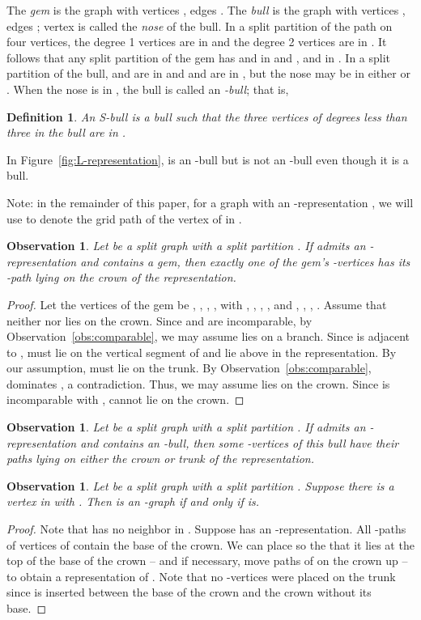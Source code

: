 \documentclass[11pt,3p,times]{elsarticle}
\newenvironment{myproof}{\begin{proof}}{\end{proof}}
\newcommand{\proofBox}{\hfill }
\newtheorem{observation}[theorem]{Observation}
\newtheorem{definition}{Definition}
\begin{document}
The {\em gem} is the graph with vertices , edges
. The {\em bull} is the graph with vertices
, edges ; vertex  is called the {\em nose}
of the bull.  In a split partition  of the path  on four
vertices, the degree 1 vertices are in  and the degree 2 vertices
are in . It follows that any split partition of the gem has  and 
in  and ,  and  in .  In a split partition of the bull,
 and  are in  and  and  are in , but the
nose  may be in either  or . When the nose is in , the
bull is called an {\em -bull}; that is,

\begin{definition}\label{def:S-bull}
An {\em S-bull} is a bull such that the three vertices of degrees
less than three in the bull are in .
\end{definition}
In Figure~\ref{fig:L-representation},  is an
-bull but  is not an -bull even though it is
a bull. 

Note: in the remainder of this paper, for a graph  with an 
-representation , we will use  to denote the grid path of 
the vertex  of  in .


\begin{observation}\label{obs:gem-on-crown}
Let  be a split graph  with a split partition .
If  admits an -representation and contains a gem, then
exactly one of the gem's -vertices has its -path lying
on the crown of the representation.
\end{observation}
\begin{myproof}
Let the vertices of the gem be , , , ,  with ,
,  , ,   and , , ,
 . Assume that neither  nor  lies on the
crown. Since  and  are incomparable, by
Observation~\ref{obs:comparable}, we may assume  lies on
a branch. Since  is adjacent to ,  must lie on
the vertical segment of  and lie above  in the
representation. By our assumption,  must lie on the trunk.
By Observation~\ref{obs:comparable},  dominates , a
contradiction. Thus, we may assume  lies on the crown.
Since  is incomparable with ,  cannot lie on the
crown.
\end{myproof}
\begin{observation}\label{obs:bull-on-vertical}
Let  be a split graph  with a split partition .
If  admits an -representation and contains an -bull,
then some -vertices of this bull have their paths lying on
either the crown or trunk of the representation. \proofBox
\end{observation}
\begin{observation}\label{obs:universal}
Let  be a split graph  with a split partition .
Suppose there is a vertex  in  with . Then
 is an -graph if and only if  is. 
\end{observation}
\begin{myproof}
Note that  has no neighbor in .  Suppose 
has an -representation.  All -paths of vertices of 
contain the base of the crown. We can place  so the that it lies at
the top of the base of the crown -- and if necessary, move paths of 
on the crown up -- to obtain a representation of . Note that
no -vertices were placed on the trunk since  is inserted 
between the base of the crown and the crown without its base. 
\end{myproof}
\end{document}

